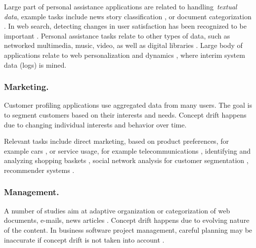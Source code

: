 \documentclass{llncs}
\begin{document}
Large part of personal assistance applications are related to handling~\emph{textual data}, example tasks include
news story classification \cite{Widyantoro05,Billsus99}, or document categorization \cite{Lebanon08,Mourao08}.
In web search, detecting changes in user satisfaction has been recognized to be important \cite{Kiseleva:2014}.
Personal assistance tasks relate to other types of data, such as networked multimedia, music, video, as well as digital libraries \cite{Hasan08}.
Large body of applications relate to web personalization and dynamics \cite{Scanlan08,Silva07,deBra03},
where interim system data (logs) is mined.


\subsubsection{Marketing.}

Customer profiling applications use aggregated data from many users.
The goal is to segment customers based on their interests and needs.
Concept drift happens due to changing individual interests and behavior over time.

Relevant tasks include direct marketing, based on product preferences,
for example cars \cite{Crespo05}, or service usage, for example telecommunications \cite{Black02},
identifying and analyzing shopping baskets \cite{Rozsypal05}, social network analysis for customer segmentation \cite{Lathia08},
recommender systems \cite{Koren10}.

\subsubsection{Management.}

A number of studies aim at adaptive organization or categorization of web documents, e-mails, news articles \cite{Yang06,Kleinberg02}. Concept drift happens due to evolving nature of the content.
In business software project management, careful planning may be inaccurate if concept drift is not taken into account \cite{Ekanayake09}.
\end{document}
